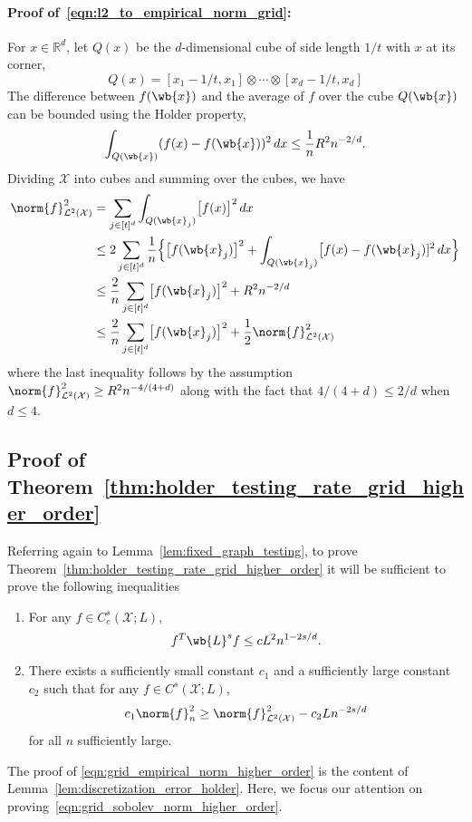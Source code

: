\documentclass{article}
\newcommand{\Reals}{\mathbb{R}}
\newcommand{\1}{\mathbf{1}}
\newcommand{\Rd}{\Reals^d}
\newcommand{\Xset}{\mathcal{X}}
\newcommand{\Leb}{\mathcal{L}}
\theoremstyle{alden}
\theoremstyle{aldenthm}
\theoremstyle{definition}
\theoremstyle{remark}
\begin{document}
\paragraph{Proof of~\eqref{eqn:l2_to_empirical_norm_grid}:}
For $x \in \Rd$, let $Q(x)$ be the $d$-dimensional cube of side length $1/t$ with $x$ at its corner,
\begin{equation*}
Q(x) = [x_1 - 1/t,x_1] \otimes \cdots \otimes [x_d - 1/t,x_d]
\end{equation*}
The difference between $f(\wb{x})$ and the average of $f$ over the cube $Q(\wb{x})$ can be bounded using the Holder property,
\begin{equation*}
\int_{Q(\wb{x})} (f(x) - f(\wb{x}))^2 \,dx \leq \frac{1}{n} R^2 n^{-2/d}.
\end{equation*}
Dividing $\Xset$ into cubes and summing over the cubes, we have
\begin{align*}
\norm{f}_{\Leb^2(\Xset)}^2 & = \sum_{j \in [t]^d} \int_{Q(\wb{x}_j)} \bigl[f(x)\bigr]^2 \,dx \\
& \leq 2 \sum_{j \in [t]^d} \frac{1}{n} \Bigl\{\bigl[f(\wb{x}_j)\bigr]^2 + \int_{Q(\wb{x}_j)} \bigl[f(x) - f(\wb{x}_j)]^2 \,dx \Bigr\} \\
& \leq \frac{2}{n}\sum_{j \in [t]^d} \bigl[f(\wb{x}_j)\bigr]^2 + R^2n^{-2/d} \\
& \leq \frac{2}{n}\sum_{j \in [t]^d} \bigl[f(\wb{x}_j)\bigr]^2 + \frac{1}{2}\norm{f}_{\Leb^2(\Xset)}^2
\end{align*}
where the last inequality follows by the assumption $\norm{f}_{\Leb^2(\Xset)}^2 \geq R^2n^{-4/(4 + d)}$ along with the fact that $4/(4 + d) \leq 2/d$ when $d \leq 4$.

\subsection{Proof of Theorem~\ref{thm:holder_testing_rate_grid_higher_order}}
Referring again to Lemma~\ref{lem:fixed_graph_testing}, to prove Theorem~\ref{thm:holder_testing_rate_grid_higher_order} it will be sufficient to prove the following inequalities
\begin{enumerate}[label=(E\arabic*)]
	\item 
	\label{event:grid_sobolev_norm_higher_order}
	For any $f \in C_c^s(\Xset;L)$,
	\begin{equation}
	\label{eqn:grid_sobolev_norm_higher_order}
	f^T \wb{L}^s f \leq c L^2 n^{1 - 2s/d}.
	\end{equation}
	\item 
	\label{event:grid_empirical_norm_higher_order}
	There exists a sufficiently small constant $c_1$ and a sufficiently large constant $c_2$ such that for any $f \in C^s(\Xset;L)$,
	\begin{equation}
	\label{eqn:grid_empirical_norm_higher_order}
	c_1 \norm{f}_n^2 \geq \norm{f}_{\Leb^2(\Xset)}^2 - c_2 L n^{-2s/d}
	\end{equation}
	for all $n$ sufficiently large.
\end{enumerate}
The proof of \eqref{eqn:grid_empirical_norm_higher_order} is the content of Lemma~\ref{lem:discretization_error_holder}. Here, we focus our attention on proving~\eqref{eqn:grid_sobolev_norm_higher_order}.
\end{document}

